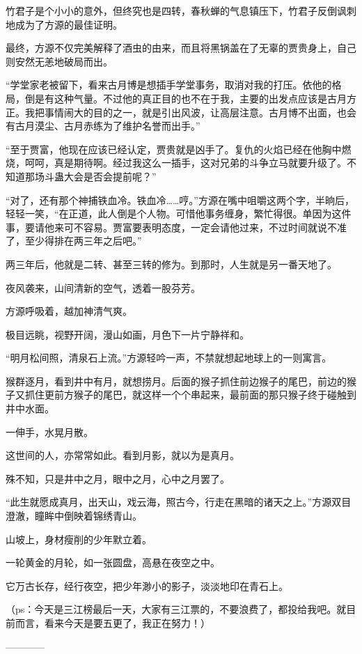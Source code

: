 \begin{this_body}
竹君子是个小小的意外，但终究也是四转，春秋蝉的气息镇压下，竹君子反倒讽刺地成为了方源的最佳证明。

最终，方源不仅完美解释了酒虫的由来，而且将黑锅盖在了无辜的贾贵身上，自己则安然无恙地破局而出。

“学堂家老被留下，看来古月博是想插手学堂事务，取消对我的打压。依他的格局，倒是有这种气量。不过他的真正目的也不在于我，主要的出发点应该是古月方正。我把事情闹大的目的之一，就是引出风波，让高层注意。古月博不出面，也会有古月漠尘、古月赤练为了维护名誉而出手。”

“至于贾富，他现在应该已经认定，贾贵就是凶手了。复仇的火焰已经在他胸中燃烧，呵呵，真是期待啊。经过我这么一插手，这对兄弟的斗争立马就要升级了。不知道那场斗蛊大会是否会提前呢？”

“对了，还有那个神捕铁血冷。铁血冷……哼。”方源在嘴中咀嚼这两个字，半晌后，轻轻一笑，“在正道，此人倒是个人物。可惜他事务缠身，繁忙得很。单因为这件事，要请他来可不容易。贾富要表明态度，一定会请他过来，不过时间就说不准了，至少得排在两三年之后吧。”

两三年后，他就是二转、甚至三转的修为。到那时，人生就是另一番天地了。

夜风袭来，山间清新的空气，透着一股芬芳。

方源呼吸着，越加神清气爽。

极目远眺，视野开阔，漫山如画，月色下一片宁静祥和。

“明月松间照，清泉石上流。”方源轻吟一声，不禁就想起地球上的一则寓言。

猴群逐月，看到井中有月，就想捞月。后面的猴子抓住前边猴子的尾巴，前边的猴子又抓住更前方猴子的尾巴，就这样一个个串起来，最前面的那只猴子终于碰触到井中水面。

一伸手，水晃月散。

这世间的人，亦常常如此。看到月影，就以为是真月。

殊不知，只是井中之月，眼中之月，心中之月罢了。

“此生就愿成真月，出天山，戏云海，照古今，行走在黑暗的诸天之上。”方源双目澄澈，瞳眸中倒映着锦绣青山。

山坡上，身材瘦削的少年默立着。

一轮黄金的月轮，如一张圆盘，高悬在夜空之中。

它万古长存，经行夜空，把少年渺小的影子，淡淡地印在青石上。

（ps：今天是三江榜最后一天，大家有三江票的，不要浪费了，都投给我吧。就目前而言，看来今天是要五更了，我正在努力！）

------------

\end{this_body}


